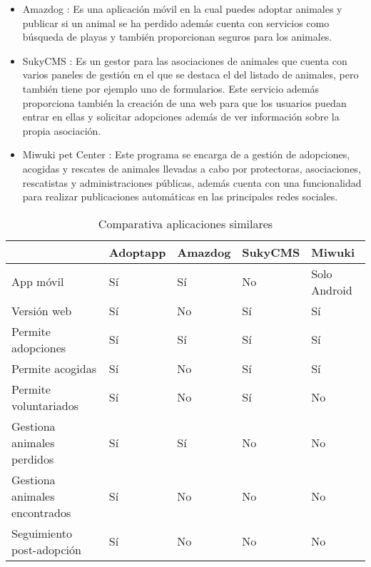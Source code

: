 \begin{itemize}
	\item Amazdog \cite{amazdog}: Es una aplicación móvil en la cual puedes adoptar animales y publicar si un animal se ha perdido además cuenta con servicios como búsqueda de playas y también proporcionan seguros para los animales.
	
	\item SukyCMS \cite{sukycms}: Es un gestor para las asociaciones de animales que cuenta con varios paneles de gestión en el que se destaca el del listado de animales, pero también tiene por ejemplo uno de formularios. Este servicio además proporciona también la creación de una web para que los usuarios puedan entrar en ellas y solicitar adopciones además de ver información sobre la propia asociación.
	
	\item Miwuki pet Center \cite{miwuki}: Este programa se encarga de a gestión de adopciones, acogidas y rescates de animales llevadas a cabo por protectoras, asociaciones, rescatistas y administraciones públicas, además cuenta con una funcionalidad para realizar publicaciones automáticas en las principales redes sociales.
	 
\end{itemize}

\begin{table}[H] %
	\centering
	\begin{tabular}{|p{3cm}|l|l|l|l|} \hline 
		& \textbf{Adoptapp} & \textbf{Amazdog} & \textbf{SukyCMS} & \textbf{Miwuki} \\ \hline
		App móvil & Sí & Sí & No & Solo Android \\ \hline
		Versión web	& Sí & No & Sí &  Sí \\ \hline
		Permite adopciones & Sí & Sí & Sí & Sí \\ \hline
		Permite acogidas & Sí & No & Sí & Sí \\ \hline
		Permite voluntariados & Sí & No & Sí & No \\ \hline
		Gestiona animales perdidos & Sí & Sí & No & No \\ \hline
		Gestiona animales encontrados & Sí & No & No & No \\ \hline
		Seguimiento post-adopción & Sí & No & No & No \\ \hline
		
    \end{tabular}
		\caption{Comparativa aplicaciones similares}
		\label{tab:appsSimilares}
	\end{table}